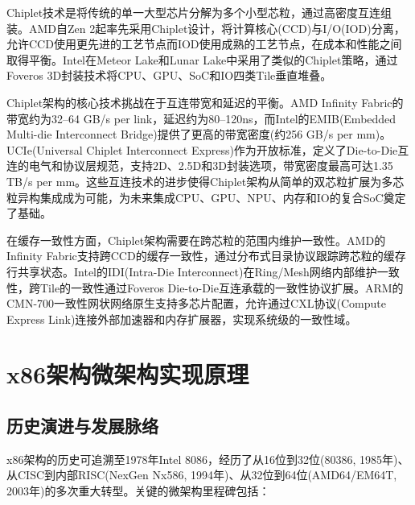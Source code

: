 \documentclass[12pt,a4paper]{IEEEtran}
\begin{document}
Chiplet技术是将传统的单一大型芯片分解为多个小型芯粒，通过高密度互连组装。AMD自Zen 2起率先采用Chiplet设计，将计算核心(CCD)与I/O(IOD)分离，允许CCD使用更先进的工艺节点而IOD使用成熟的工艺节点，在成本和性能之间取得平衡\cite{amd2019chiplet}。Intel在Meteor Lake和Lunar Lake中采用了类似的Chiplet策略，通过Foveros 3D封装技术将CPU、GPU、SoC和IO四类Tile垂直堆叠\cite{intel2024lunarlake}。

Chiplet架构的核心技术挑战在于互连带宽和延迟的平衡。AMD Infinity Fabric的带宽约为32--64 GB/s per link，延迟约为80--120ns，而Intel的EMIB(Embedded Multi-die Interconnect Bridge)提供了更高的带宽密度(约256 GB/s per mm)。UCIe(Universal Chiplet Interconnect Express)作为开放标准，定义了Die-to-Die互连的电气和协议层规范，支持2D、2.5D和3D封装选项，带宽密度最高可达1.35 TB/s per mm\cite{amd2019chiplet}。这些互连技术的进步使得Chiplet架构从简单的双芯粒扩展为多芯粒异构集成成为可能，为未来集成CPU、GPU、NPU、内存和IO的复合SoC奠定了基础。

在缓存一致性方面，Chiplet架构需要在跨芯粒的范围内维护一致性。AMD的Infinity Fabric支持跨CCD的缓存一致性，通过分布式目录协议跟踪跨芯粒的缓存行共享状态。Intel的IDI(Intra-Die Interconnect)在Ring/Mesh网络内部维护一致性，跨Tile的一致性通过Foveros Die-to-Die互连承载的一致性协议扩展。ARM的CMN-700一致性网状网络原生支持多芯片配置，允许通过CXL协议(Compute Express Link)连接外部加速器和内存扩展器，实现系统级的一致性域\cite{arm2022cmn700}。

\section{x86架构微架构实现原理}

\subsection{历史演进与发展脉络}

x86架构的历史可追溯至1978年Intel 8086，经历了从16位到32位(80386, 1985年)、从CISC到内部RISC(NexGen Nx586, 1994年)、从32位到64位(AMD64/EM64T, 2003年)的多次重大转型\cite{colwell1995intel}。关键的微架构里程碑包括：
\end{document}
